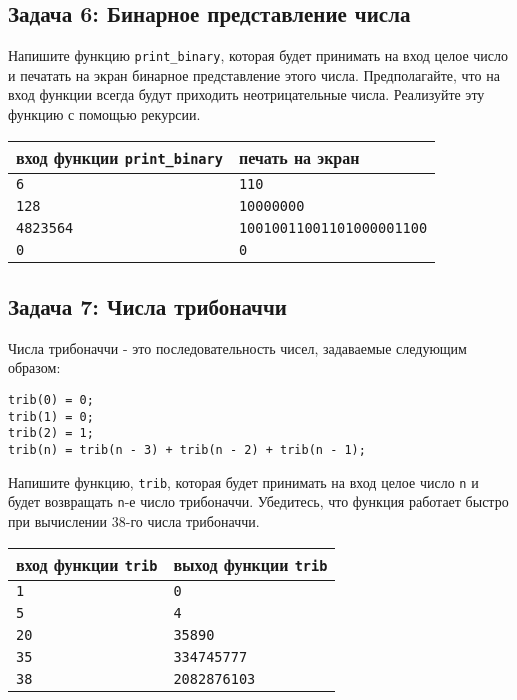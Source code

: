 \documentclass{article}
\begin{document}
 
\subsection*{Задача 6: Бинарное представление числа}
Напишите функцию \texttt{print\_binary}, которая будет принимать на вход целое число и печатать на экран бинарное представление этого числа. Предполагайте, что на вход функции всегда будут приходить неотрицательные числа.
Реализуйте эту функцию с помощью рекурсии.
 
\begin{center}
\begin{tabular}{ l | l }
 вход функции \texttt{print\_binary} & печать на экран \\ \hline
 \texttt{6} & \texttt{110}  \\
 \texttt{128} & \texttt{10000000}  \\  
 \texttt{4823564} & \texttt{10010011001101000001100}  \\
 \texttt{0} & \texttt{0}  \\
\end{tabular}
\end{center} 
 
 
\subsection*{Задача 7: Числа трибоначчи}
Числа трибоначчи - это последовательность чисел, задаваемые следующим образом:
\begin{verbatim}
trib(0) = 0; 
trib(1) = 0; 
trib(2) = 1;
trib(n) = trib(n - 3) + trib(n - 2) + trib(n - 1);
\end{verbatim}
Напишите функцию, \texttt{trib}, которая будет принимать на вход целое число \texttt{n} и будет возвращать \texttt{n}-е число трибоначчи. Убедитесь, что функция работает быстро при вычислении 38-го числа трибоначчи.

\begin{center}
\begin{tabular}{ l | l }
 вход функции \texttt{trib} & выход функции \texttt{trib} \\ \hline
 \texttt{1} & \texttt{0}  \\
 \texttt{5} & \texttt{4}  \\
 \texttt{20} & \texttt{35890}  \\
 \texttt{35} & \texttt{334745777}  \\
 \texttt{38} & \texttt{2082876103}  \\
\end{tabular}
\end{center} 
 
\end{document}
